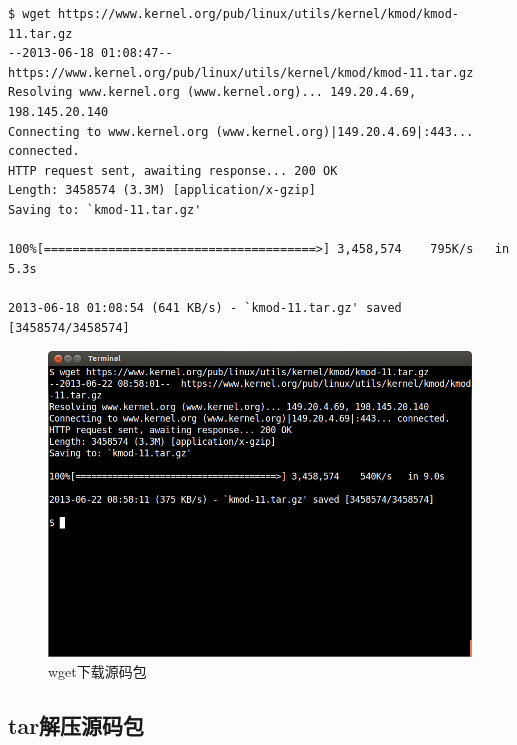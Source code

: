 {\begin{shaded}\begin{verbatim}
$ wget https://www.kernel.org/pub/linux/utils/kernel/kmod/kmod-11.tar.gz
--2013-06-18 01:08:47--  https://www.kernel.org/pub/linux/utils/kernel/kmod/kmod-11.tar.gz
Resolving www.kernel.org (www.kernel.org)... 149.20.4.69, 198.145.20.140
Connecting to www.kernel.org (www.kernel.org)|149.20.4.69|:443... connected.
HTTP request sent, awaiting response... 200 OK
Length: 3458574 (3.3M) [application/x-gzip]
Saving to: `kmod-11.tar.gz'

100%[======================================>] 3,458,574    795K/s   in 5.3s    

2013-06-18 01:08:54 (641 KB/s) - `kmod-11.tar.gz' saved [3458574/3458574]
\end{verbatim}\end{shaded}}
\begin{figure}[htbp]
\centering
\includegraphics{./pictures/1-1-wget.png}
\caption{wget下载源码包}
\end{figure}

\subsection{tar解压源码包}

